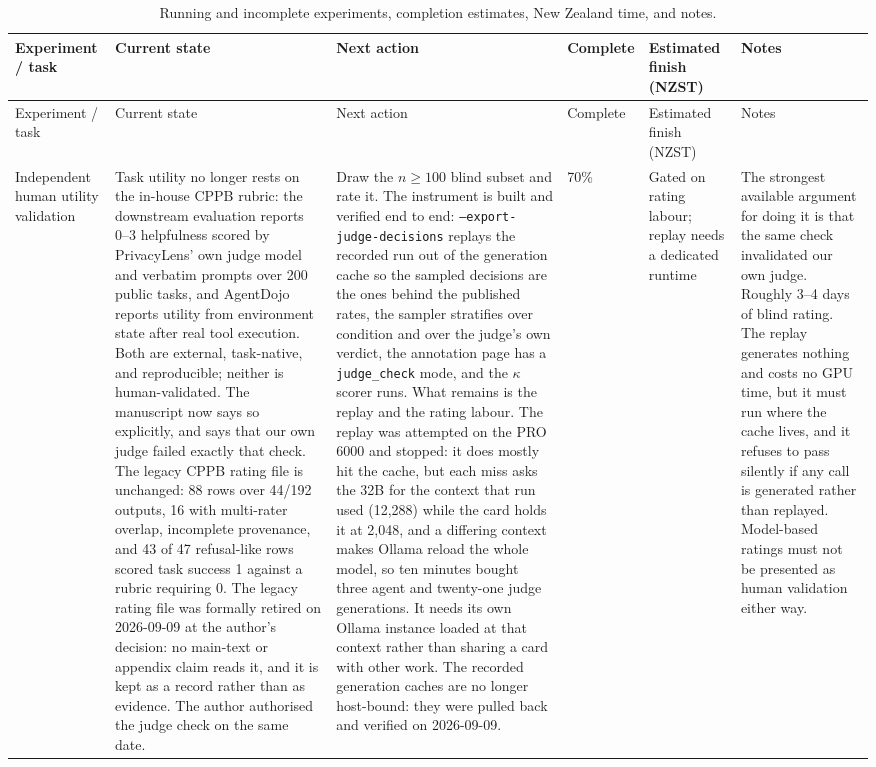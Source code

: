 \documentclass[11pt]{article}
\begin{document}
\begin{longtable}{p{}p{}p{}p{}p{}p{}}
\caption{Running and incomplete experiments, completion estimates, New Zealand time, and notes.}\label{tab:next_steps}\\
\toprule
Experiment / task & Current state & Next action & Complete & Estimated finish (NZST) & Notes \\
\midrule
\endfirsthead
\toprule
Experiment / task & Current state & Next action & Complete & Estimated finish (NZST) & Notes \\
\midrule
\endhead
\bottomrule
\endfoot
Independent human utility validation & Task utility no longer rests on the in-house CPPB rubric: the downstream evaluation reports 0--3 helpfulness scored by PrivacyLens' own judge model and verbatim prompts over 200 public tasks, and AgentDojo reports utility from environment state after real tool execution. Both are external, task-native, and reproducible; neither is human-validated. The manuscript now says so explicitly, and says that our own judge failed exactly that check. The legacy CPPB rating file is unchanged: 88 rows over 44/192 outputs, 16 with multi-rater overlap, incomplete provenance, and 43 of 47 refusal-like rows scored task success 1 against a rubric requiring 0. The legacy rating file was formally retired on 2026-09-09 at the author's decision: no main-text or appendix claim reads it, and it is kept as a record rather than as evidence. The author authorised the judge check on the same date. & Draw the $n\ge100$ blind subset and rate it. The instrument is built and verified end to end: \texttt{--export-judge-decisions} replays the recorded run out of the generation cache so the sampled decisions are the ones behind the published rates, the sampler stratifies over condition and over the judge's own verdict, the annotation page has a \texttt{judge\_check} mode, and the $\kappa$ scorer runs. What remains is the replay and the rating labour. The replay was attempted on the PRO 6000 and stopped: it does mostly hit the cache, but each miss asks the 32B for the context that run used (12{,}288) while the card holds it at 2{,}048, and a differing context makes Ollama reload the whole model, so ten minutes bought three agent and twenty-one judge generations. It needs its own Ollama instance loaded at that context rather than sharing a card with other work. The recorded generation caches are no longer host-bound: they were pulled back and verified on 2026-09-09. & 70\% & Gated on rating labour; replay needs a dedicated runtime & The strongest available argument for doing it is that the same check invalidated our own judge. Roughly 3--4 days of blind rating. The replay generates nothing and costs no GPU time, but it must run where the cache lives, and it refuses to pass silently if any call is generated rather than replayed. Model-based ratings must not be presented as human validation either way. \\

\end{longtable}
\end{document}
